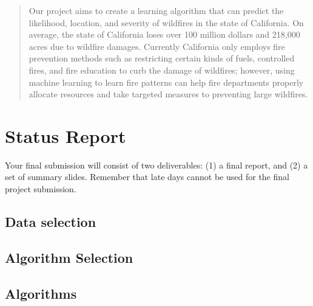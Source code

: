 \documentclass{article}
\begin{document}
 


\begin{abstract} 
Our project aims to create a learning algorithm that can predict the likelihood, location, and severity of wildfires in the state of California. On average, the state of California loses over 100 million dollars and 218,000 acres\cite{calfire11} due to wildfire damages. Currently California only employs fire prevention methods such as restricting certain kinds of fuels, controlled fires, and fire education to curb the damage of wildfires; however, using machine learning to learn fire patterns can help fire departments properly allocate resources and take targeted measures to preventing large wildfires.
\end{abstract} 

\section{Status Report}

Your final submission will consist of two deliverables:  (1) a final report, and (2) a set of summary slides.  Remember that late days cannot be used for
the final project submission.

\subsection{Data selection} 
\subsection{Algorithm Selection}
\subsection{Algorithms}
\end{document}
